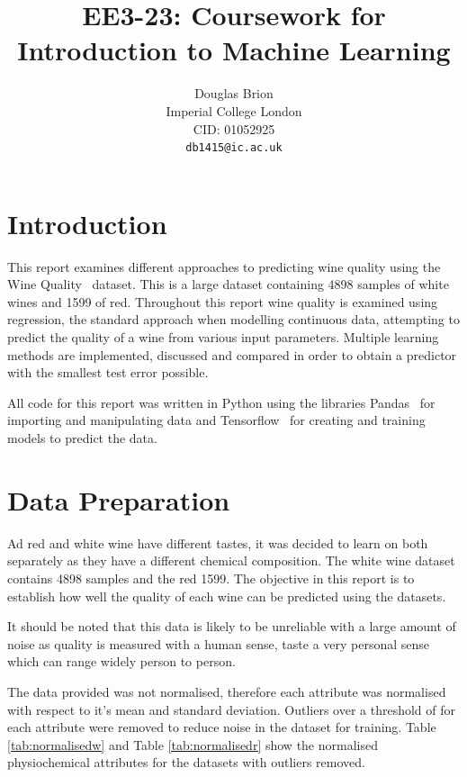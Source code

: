 \documentclass[10pt,twocolumn,letterpaper]{article}
\begin{document}
\title{EE3-23: Coursework for Introduction to Machine Learning}

\author{Douglas Brion\\
Imperial College London\\
CID: 01052925\\
{\tt\small db1415@ic.ac.uk}
}

\maketitle


\section{Introduction}

This report examines different approaches to predicting wine quality using the Wine Quality~\cite{WineQuality} dataset. This is a large dataset containing 4898 samples of white wines and 1599 of red. Throughout this report wine quality is examined using regression, the standard approach when modelling continuous data, attempting to predict the quality of a wine from various input parameters. Multiple learning methods are implemented, discussed and compared in order to obtain a predictor with the smallest test error possible.

All code for this report was written in Python using the libraries Pandas~\cite{mckinneypandas} for importing and manipulating data and Tensorflow~\cite{tensorflow2015-whitepaper} for creating and training models to predict the data.

\section{Data Preparation}
Ad red and white wine have different tastes, it was decided to learn on both separately as they have a different chemical composition. The white wine dataset contains 4898 samples and the red 1599. The objective in this report is to establish how well the quality of each wine can be predicted using the datasets.

It should be noted that this data is likely to be unreliable with a large amount of noise as quality is measured with a human sense, taste a very personal sense which can range widely person to person.

The data provided was not normalised, therefore each attribute was normalised with respect to it's mean and standard deviation. Outliers over a threshold of for each attribute were removed to reduce noise in the dataset for training. Table \ref{tab:normalisedw} and Table \ref{tab:normalisedr} show the normalised physiochemical attributes for the datasets with outliers removed. 
\end{document}
